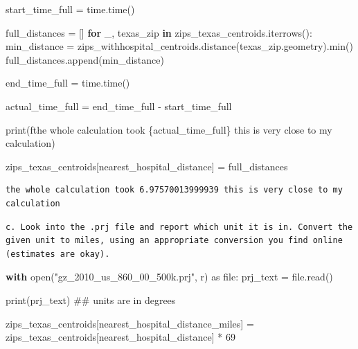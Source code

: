 \documentclass[
  letterpaper,
  DIV=11,
  numbers=noendperiod]{scrartcl}
\newenvironment{Shaded}{\begin{snugshade}}{\end{snugshade}}
\newcommand{\BuiltInTok}[1]{\textcolor[rgb]{0.00,0.23,0.31}{#1}}
\newcommand{\CommentTok}[1]{\textcolor[rgb]{0.37,0.37,0.37}{#1}}
\newcommand{\ControlFlowTok}[1]{\textcolor[rgb]{0.00,0.23,0.31}{\textbf{#1}}}
\newcommand{\DecValTok}[1]{\textcolor[rgb]{0.68,0.00,0.00}{#1}}
\newcommand{\ImportTok}[1]{\textcolor[rgb]{0.00,0.46,0.62}{#1}}
\newcommand{\KeywordTok}[1]{\textcolor[rgb]{0.00,0.23,0.31}{\textbf{#1}}}
\newcommand{\NormalTok}[1]{\textcolor[rgb]{0.00,0.23,0.31}{#1}}
\newcommand{\OperatorTok}[1]{\textcolor[rgb]{0.37,0.37,0.37}{#1}}
\newcommand{\SpecialCharTok}[1]{\textcolor[rgb]{0.37,0.37,0.37}{#1}}
\newcommand{\SpecialStringTok}[1]{\textcolor[rgb]{0.13,0.47,0.30}{#1}}
\newcommand{\StringTok}[1]{\textcolor[rgb]{0.13,0.47,0.30}{#1}}
\begin{document}
\begin{Shaded}
\begin{Highlighting}[]
\NormalTok{start\_time\_full }\OperatorTok{=}\NormalTok{ time.time()}

\NormalTok{full\_distances }\OperatorTok{=}\NormalTok{ []}
\ControlFlowTok{for}\NormalTok{ \_, texas\_zip }\KeywordTok{in}\NormalTok{ zips\_texas\_centroids.iterrows():}
\NormalTok{    min\_distance }\OperatorTok{=}\NormalTok{ zips\_withhospital\_centroids.distance(texas\_zip.geometry).}\BuiltInTok{min}\NormalTok{()}
\NormalTok{    full\_distances.append(min\_distance)}


\NormalTok{end\_time\_full }\OperatorTok{=}\NormalTok{ time.time()}

\NormalTok{actual\_time\_full }\OperatorTok{=}\NormalTok{ end\_time\_full }\OperatorTok{{-}}\NormalTok{ start\_time\_full}

\BuiltInTok{print}\NormalTok{(}\SpecialStringTok{f\textquotesingle{}the whole calculation took }\SpecialCharTok{\{}\NormalTok{actual\_time\_full}\SpecialCharTok{\}}\SpecialStringTok{ this is very close to my calculation\textquotesingle{}}\NormalTok{)}

\NormalTok{zips\_texas\_centroids[}\StringTok{\textquotesingle{}nearest\_hospital\_distance\textquotesingle{}}\NormalTok{] }\OperatorTok{=}\NormalTok{ full\_distances}
\end{Highlighting}
\end{Shaded}

\begin{verbatim}
the whole calculation took 6.97570013999939 this is very close to my calculation
\end{verbatim}

\begin{verbatim}
c. Look into the .prj file and report which unit it is in. Convert the given unit to miles, using an appropriate conversion you find online (estimates are okay).
\end{verbatim}

\begin{Shaded}
\begin{Highlighting}[]
\ControlFlowTok{with} \BuiltInTok{open}\NormalTok{(}\StringTok{"gz\_2010\_us\_860\_00\_500k.prj"}\NormalTok{, }\StringTok{\textquotesingle{}r\textquotesingle{}}\NormalTok{) }\ImportTok{as} \BuiltInTok{file}\NormalTok{:}
\NormalTok{    prj\_text }\OperatorTok{=} \BuiltInTok{file}\NormalTok{.read()}

\BuiltInTok{print}\NormalTok{(prj\_text) }\CommentTok{\#\# units are in degrees}

\NormalTok{zips\_texas\_centroids[}\StringTok{\textquotesingle{}nearest\_hospital\_distance\_miles\textquotesingle{}}\NormalTok{] }\OperatorTok{=}\NormalTok{ zips\_texas\_centroids[}\StringTok{\textquotesingle{}nearest\_hospital\_distance\textquotesingle{}}\NormalTok{] }\OperatorTok{*} \DecValTok{69}
\end{Highlighting}
\end{Shaded}
\end{document}
